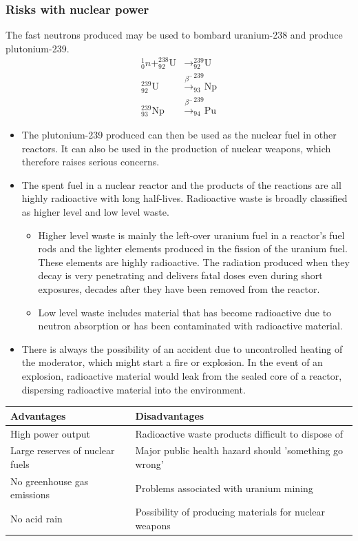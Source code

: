 \documentclass[a4paper,12pt]{article}
\begin{document}
\subsubsection*{Risks with nuclear power}
The fast neutrons produced may be used to bombard uranium-238 and produce plutonium-239.
\[
\begin{aligned}
^1_0n + ^{238}_{92}\text{U} &\rightarrow ^{239}_{92}\text{U}\\
^{239}_{92}\text{U} &\xrightarrow{\beta^-} ^{239}_{93}\text{Np}\\
^{239}_{93}\text{Np} &\xrightarrow{\beta^-} ^{239}_{94}\text{Pu}
\end{aligned}\]
\begin{itemize}
  \item The plutonium-239 produced can then be used as the nuclear fuel in other reactors. It can also be used in the production of nuclear weapons, which therefore raises serious concerns.
  \item The spent fuel in a nuclear reactor and the products of the reactions are all highly radioactive with long half-lives. Radioactive waste is broadly classified as higher level and low level waste.
  \begin{itemize}
    \item Higher level waste is mainly the left-over uranium fuel in a reactor's fuel rods and the lighter elements produced in the fission of the uranium fuel. These elements are highly radioactive. The radiation produced when they decay is very penetrating and delivers fatal doses even during short exposures, decades after they have been removed from the reactor.
    \item Low level waste includes material that has become radioactive due to neutron absorption or has been contaminated with radioactive material. 
  \end{itemize}
  \item There is always the possibility of an accident due to uncontrolled heating of the moderator, which might start a fire or explosion. In the event of an explosion, radioactive material would leak from the sealed core of a reactor, dispersing radioactive material into the environment.
\end{itemize}
\begin{center}
\begin{tabularx}{\textwidth}{@{}|Y |Y |@{}}
\toprule
\textbf{Advantages} & \textbf{Disadvantages}\\
\midrule
High power output & Radioactive waste products difficult to dispose of\\
\midrule
Large reserves of nuclear fuels & Major public health hazard should 'something go wrong'\\
\midrule
No greenhouse gas emissions & Problems associated with uranium mining\\
\midrule
No acid rain & Possibility of producing materials for nuclear weapons\\
\bottomrule
\end{tabularx}
\end{center}
\end{document}
